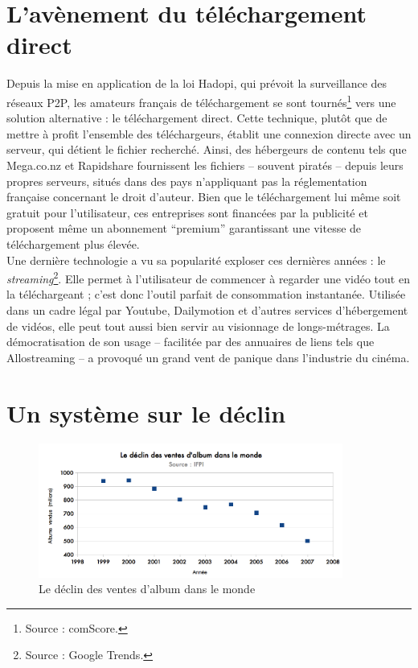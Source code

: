 \documentclass[a4paper]{report}
\begin{document}
	\section{L'avènement du téléchargement direct}
	Depuis la mise en application de la loi Hadopi, qui prévoit la surveillance des réseaux P2P, les amateurs français de téléchargement se sont tournés\footnote{Source : comScore.} vers une solution alternative : le téléchargement direct. Cette technique, plutôt que de mettre à profit l'ensemble des téléchargeurs, établit une connexion directe avec un serveur, qui détient le fichier recherché. Ainsi, des hébergeurs de contenu tels que Mega.co.nz et Rapidshare fournissent les fichiers – souvent piratés – depuis leurs propres serveurs, situés dans des pays n'appliquant pas la réglementation française concernant le droit d'auteur. Bien que le téléchargement lui même soit gratuit pour l'utilisateur, ces entreprises sont financées par la publicité et proposent même un abonnement ``premium'' garantissant une vitesse de téléchargement plus élevée.\\

	Une dernière technologie a vu sa popularité exploser ces dernières années : le \emph{streaming}\footnote{Source : Google Trends.}. Elle permet à l'utilisateur de commencer à regarder une vidéo tout en la téléchargeant ; c'est donc l'outil parfait de consommation instantanée. Utilisée dans un cadre légal par Youtube, Dailymotion et d'autres services d'hébergement de vidéos, elle peut tout aussi bien servir au visionnage de longs-métrages. La démocratisation de son usage – facilitée par des annuaires de liens tels que Allostreaming – a provoqué un grand vent de panique dans l'industrie du cinéma.

	\section{Un système sur le déclin}
	\label{declin-systeme}

	\begin{figure}[ht]
		\begin{center}
			\includegraphics[width=10cm]{images/ventes-albums.png}
			\caption{Le déclin des ventes d'album dans le monde}
		\end{center}
	\end{figure}
\end{document}
